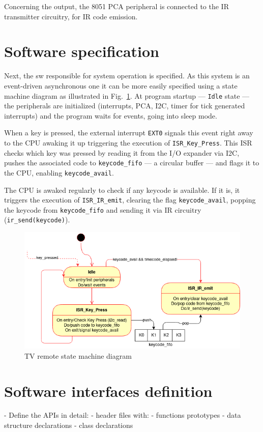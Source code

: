 Concerning the output, the 8051 PCA peripheral is connected to the IR
transmitter circuitry, for IR code emission.
%
  \vspace{-5mm}
%  
\section{Software specification}
\label{sec:sw-specs}
Next, the \gls{sw} responsible for system operation is specified. As this system
is an event-driven asynchronous one it can be more easily specified using a
state machine diagram as illustrated in Fig.~\ref{fig:state-mach}. At program
startup --- \texttt{Idle} state --- the peripherals are initialized (interrupts, PCA, I2C, timer for tick
generated interrupts) and the program waits for events, going into sleep
mode.

When a key is pressed, the external interrupt \texttt{EXT0} signals this
event right away to the CPU awaking it up triggering the execution of
\texttt{ISR\_Key\_Press}. This ISR checks which key was pressed by reading it
from the I/O expander via I2C, pushes the associated code to
\texttt{keycode\_fifo} --- a circular buffer --- and flags it to the CPU, enabling \texttt{keycode\_avail}.

The CPU is awaked regularly to check if any keycode is available. If it is, it
triggers the execution of \texttt{ISR\_IR\_emit}, clearing the flag
\texttt{keycode\_avail}, popping the keycode from \texttt{keycode\_fifo} and
sending it via IR circuitry (\texttt{ir\_send(keycode)}).
%
  \vspace{-5mm}
%  
\begin{figure}[htb!]
\centering
    \includegraphics[width=0.7\columnwidth]{./img/state-mach.png}
  \caption{TV remote state machine diagram}%
\label{fig:state-mach}
\end{figure}
%
  \vspace{-5mm}
%  
\section{Software interfaces definition}
\label{sec:sw-interf-def}
- Define the APIs in detail:
  - header files with:
    - functions prototypes
    - data structure declarations
    - class declarations

